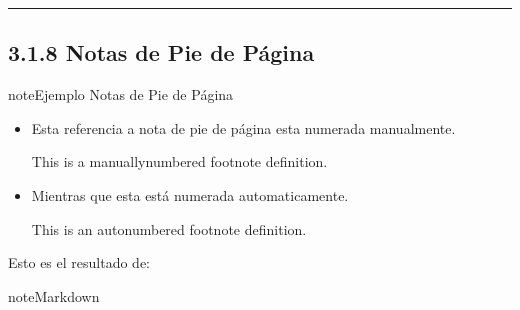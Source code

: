 \documentclass[a4paper,10pt,spanish]{sphinxmanual}
\begin{document}
\bigskip\hrule\bigskip



\subsection{3.1.8 Notas de Pie de Página}
\label{\detokenize{3_guia_myst/tipografia:notas-de-pie-de-pagina}}
\begin{sphinxadmonition}{note}{Ejemplo Notas de Pie de Página}
\begin{itemize}
\item {} 
\sphinxAtStartPar
Esta referencia a nota de pie de página esta numerada manualmente.%
\begin{footnote}[3]\sphinxAtStartFootnote
This is a manually\sphinxhyphen{}numbered footnote definition.
%
\end{footnote}

\item {} 
\sphinxAtStartPar
Mientras que esta está numerada automaticamente.%
\begin{footnote}[1]\sphinxAtStartFootnote
This is an auto\sphinxhyphen{}numbered footnote definition.
%
\end{footnote}

\end{itemize}
\end{sphinxadmonition}

\sphinxAtStartPar
Esto es el resultado de:

\begin{sphinxadmonition}{note}{Markdown}

\begin{sphinxVerbatim}[commandchars=\\\{\}]
           \PYG{p}{[}\PYG{p}{]}
      \PYG{p}{[}\PYG{p}{]}
\PYG{p}{[}\PYG{p}{]}      
\PYG{p}{[}\PYG{p}{]}      
\end{sphinxVerbatim}
\end{sphinxadmonition}
\end{document}
